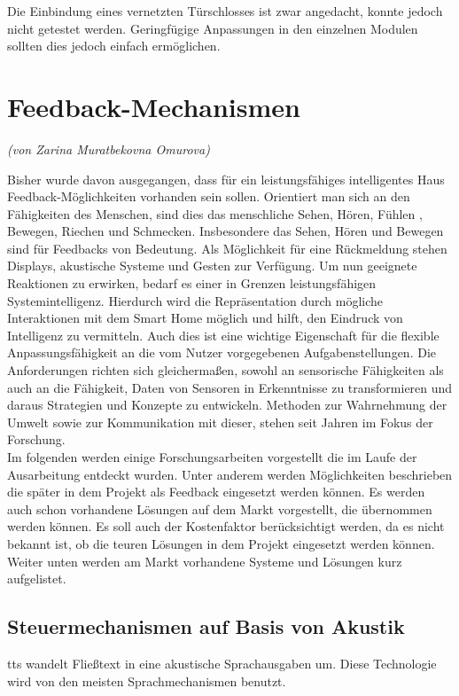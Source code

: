 Die Einbindung eines vernetzten Türschlosses ist zwar angedacht, konnte jedoch nicht getestet werden. Geringfügige Anpassungen in den einzelnen Modulen sollten dies jedoch einfach ermöglichen.


\newpage
\section{Feedback-Mechanismen}
\label{sec:feedbackMechanismen}
\emph{(von Zarina Muratbekovna Omurova)}

\noindent
Bisher wurde davon ausgegangen, dass für ein leistungsfähiges intelligentes Haus Feedback-Möglichkeiten vorhanden sein sollen. Orientiert man sich an den Fähigkeiten des Menschen, sind dies das menschliche Sehen, Hören, Fühlen , Bewegen, Riechen und Schmecken. Insbesondere das Sehen, Hören und Bewegen sind für Feedbacks von Bedeutung. Als Möglichkeit für eine Rückmeldung stehen Displays, akustische Systeme und Gesten zur Verfügung. Um nun geeignete Reaktionen zu erwirken, bedarf es einer in Grenzen leistungsfähigen Systemintelligenz. Hierdurch wird die Repräsentation durch mögliche Interaktionen mit dem Smart Home möglich und hilft, den Eindruck von \glqq Intelligenz\grqq{} zu vermitteln. Auch dies ist eine wichtige Eigenschaft für die flexible Anpassungsfähigkeit an die vom Nutzer vorgegebenen Aufgabenstellungen. Die Anforderungen richten sich gleichermaßen, sowohl an sensorische Fähigkeiten als auch an die Fähigkeit, Daten von Sensoren in Erkenntnisse zu transformieren und daraus Strategien und Konzepte zu entwickeln. Methoden zur Wahrnehmung der Umwelt sowie zur Kommunikation mit dieser, stehen seit Jahren im Fokus der Forschung.\\
Im folgenden werden einige Forschungsarbeiten vorgestellt die im Laufe der Ausarbeitung entdeckt wurden. Unter anderem werden Möglichkeiten beschrieben die später in dem Projekt als Feedback eingesetzt werden können. Es werden auch schon vorhandene Lösungen auf dem Markt vorgestellt, die übernommen werden können. Es soll auch der Kostenfaktor berücksichtigt werden, da es nicht bekannt ist, ob die teuren Lösungen in dem Projekt eingesetzt werden können.\\
Weiter unten werden am Markt vorhandene Systeme und Lösungen kurz aufgelistet.\\

\subsection{Steuermechanismen auf Basis von Akustik}
\acrfull{tts} wandelt Fließtext in eine akustische Sprachausgaben um. Diese Technologie wird von den meisten Sprachmechanismen benutzt.

